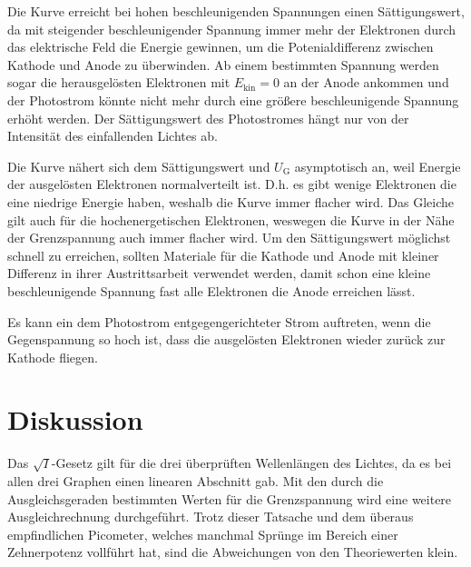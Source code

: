 \documentclass[titlepage = firstcover]{scrartcl}
\begin{document}
            \FloatBarrier

            Die Kurve erreicht bei hohen beschleunigenden Spannungen einen Sättigungswert, da mit steigender beschleunigender Spannung immer mehr der Elektronen durch das elektrische Feld die Energie gewinnen, um die Potenialdifferenz zwischen Kathode und Anode zu überwinden.
            Ab einem bestimmten Spannung werden sogar die herausgelösten Elektronen mit $E_{\text{kin}} = 0$ an der Anode ankommen und der Photostrom könnte nicht mehr durch eine größere beschleunigende Spannung erhöht werden.
            Der Sättigungswert des Photostromes hängt nur von der Intensität des einfallenden Lichtes ab.

            Die Kurve nähert sich dem Sättigungswert und $U_{\text{G}}$ asymptotisch an, weil Energie der ausgelösten Elektronen normalverteilt ist.
            D.h. es gibt wenige Elektronen die eine niedrige Energie haben, weshalb die Kurve immer flacher wird.
            Das Gleiche gilt auch für die hochenergetischen Elektronen, weswegen die Kurve in der Nähe der Grenzspannung auch immer flacher wird.
            Um den Sättigungswert möglichst schnell zu erreichen, sollten Materiale für die Kathode und Anode mit kleiner Differenz in ihrer Austrittsarbeit verwendet werden, damit schon eine kleine beschleunigende Spannung fast alle Elektronen die Anode erreichen lässt.

            Es kann ein dem Photostrom entgegengerichteter Strom auftreten, wenn die Gegenspannung so hoch ist, dass die ausgelösten Elektronen wieder zurück zur Kathode fliegen.

    \section{Diskussion}
        Das $\sqrt{I}$-Gesetz gilt für die drei überprüften Wellenlängen des Lichtes, da es bei allen drei Graphen einen linearen Abschnitt gab. Mit den durch die Ausgleichsgeraden bestimmten Werten für die Grenzspannung wird eine weitere Ausgleichrechnung durchgeführt. Trotz dieser Tatsache und dem überaus empfindlichen Picometer, welches manchmal Sprünge im Bereich einer Zehnerpotenz vollführt hat, sind die Abweichungen von den Theoriewerten klein.

    \newpage
\end{document}

